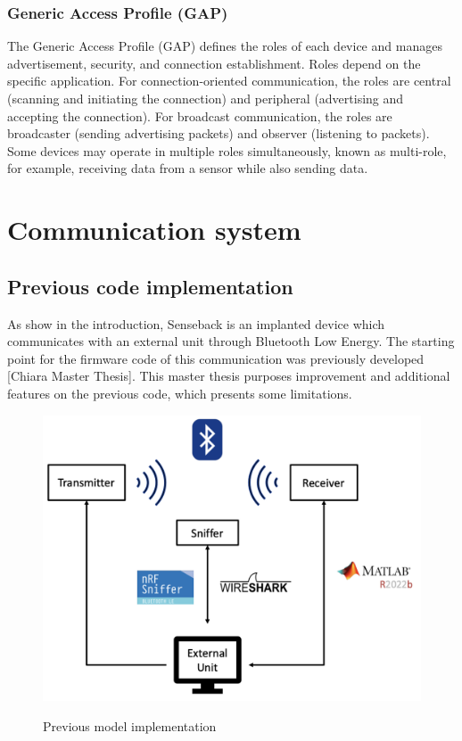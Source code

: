 \documentclass{Configuration_Files/PoliMi3i_thesis}
\begin{document}
\subsubsection{Generic Access Profile (GAP)}
The Generic Access Profile (GAP) defines the roles of each device and manages advertisement, security, and connection establishment. Roles depend on the specific application. For connection-oriented communication, the roles are central (scanning and initiating the connection) and peripheral (advertising and accepting the connection). For broadcast communication, the roles are broadcaster (sending advertising packets) and observer (listening to packets). Some devices may operate in multiple roles simultaneously, known as multi-role, for example, receiving data from a sensor while also sending data.


\section{Communication system}

\subsection{Previous code implementation}

As show in the introduction, Senseback is an implanted device which communicates with an external unit through Bluetooth Low Energy. The starting point for the firmware code of this communication was previously developed [Chiara Master Thesis]. This master thesis purposes improvement and additional features on the previous code, which presents some limitations.

\begin{figure}[H]
	\includegraphics[scale=0.3]{prev1.png}
	\centering
    \label{prev_1}
    \caption{Previous model implementation}
\end{figure}
\end{document}
